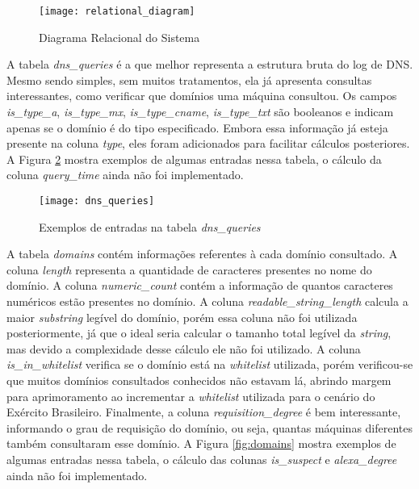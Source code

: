\begin{figure}
\texttt{[image: relational\_diagram]}
\caption[Diagrama Relacional do Sistema]{Diagrama Relacional do Sistema} \label{fig:relational_diagram}
\end{figure}

A tabela \textit{dns\_queries} é a que melhor representa a estrutura bruta do log de DNS. Mesmo sendo simples, sem muitos tratamentos, ela já apresenta consultas interessantes, como verificar que domínios uma máquina consultou. Os campos \textit{is\_type\_a}, \textit{is\_type\_mx}, \textit{is\_type\_cname}, \textit{is\_type\_txt} são booleanos e indicam apenas se o domínio é do tipo especificado. Embora essa informação já esteja presente na coluna \textit{type}, eles foram adicionados para facilitar cálculos posteriores. A Figura \ref{fig:dns_queries} mostra exemplos de algumas entradas nessa tabela, o cálculo da coluna \textit{query\_time} ainda não foi implementado.

\begin{figure}
\texttt{[image: dns\_queries]}
\caption[Exemplos de entradas na tabela \textit{dns\_queries}]{Exemplos de entradas na tabela \textit{dns\_queries}} \label{fig:dns_queries}
\end{figure}

A tabela \textit{domains} contém informações referentes à cada domínio consultado. A coluna \textit{length} representa a quantidade de caracteres presentes no nome do domínio. A coluna \textit{numeric\_count} contém a informação de quantos caracteres numéricos estão presentes no domínio. A coluna \textit{readable\_string\_length} calcula a maior \textit{substring} legível do domínio, porém essa coluna não foi utilizada posteriormente, já que o ideal seria calcular o tamanho total legível da \textit{string}, mas devido a complexidade desse cálculo  ele não foi utilizado. A coluna \textit{is\_in\_whitelist} verifica se o domínio está na \textit{whitelist} utilizada, porém verificou-se que muitos domínios consultados conhecidos não estavam lá, abrindo margem para aprimoramento ao incrementar a \textit{whitelist} utilizada para o cenário do Exército Brasileiro. Finalmente, a coluna \textit{requisition\_degree} é bem interessante, informando o grau de requisição do domínio, ou seja, quantas máquinas diferentes também consultaram esse domínio. A Figura \ref{fig:domains} mostra exemplos de algumas entradas nessa tabela, o cálculo das colunas \textit{is\_suspect} e \textit{alexa\_degree} ainda não foi implementado.

